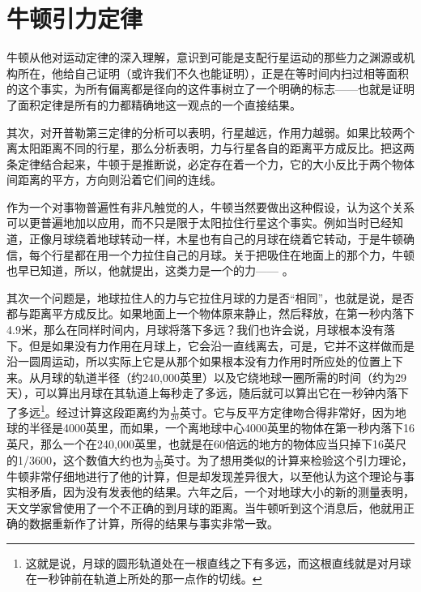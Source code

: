 \documentclass[12pt,oneside]{book}
\begin{document}
\section{牛顿引力定律}
牛顿从他对运动定律的深入理解，意识到可能是支配行星运动的那些力之渊源或机构所在，他给自己证明（或许我们不久也能证明），正是在等时间内扫过相等面积的这个事实，为所有偏离都是径向的这件事树立了一个明确的标志——也就是证明了面积定律是所有的力都精确地这一观点的一个直接结果。

其次，对开普勒第三定律的分析可以表明，行星越远，作用力越弱。如果比较两个离太阳距离不同的行星，那么分析表明，力与行星各自的距离平方成反比。把这两条定律结合起来，牛顿于是推断说，必定存在着一个力，它的大小反比于两个物体间距离的平方，方向则沿着它们间的连线。

作为一个对事物普遍性有非凡触觉的人，牛顿当然要做出这种假设，认为这个关系可以更普遍地加以应用，而不只是限于太阳拉住行星这个事实。例如当时已经知道，正像月球绕着地球转动一样，木星也有自己的月球在绕着它转动，于是牛顿确信，每个行星都在用一个力拉住自己的月球。关于把吸住在地面上的那个力，牛顿也早已知道，所以，他就提出，这类力是一个的力—— 。

其次一个问题是，地球拉住人的力与它拉住月球的力是否“相同”，也就是说，是否都与距离平方成反比。如果地面上一个物体原来静止，然后释放，在第一秒内落下4.9米，那么在同样时间内，月球将落下多远？我们也许会说，月球根本没有落下。但是如果没有力作用在月球上，它会沿一直线离去，可是，它并不这样做而是沿一圆周运动，所以实际上它是从那个如果根本没有力作用时所应处的位置上下来。从月球的轨道半径（约240,000英里）以及它绕地球一圈所需的时间（约为29天），可以算出月球在其轨道上每秒走了多远，随后就可以算出它在一秒钟内落下了多远\footnote{这就是说，月球的圆形轨道处在一根直线之下有多远，而这根直线就是对月球在一秒钟前在轨道上所处的那一点作的切线。}。经过计算这段距离约为$\frac{1}{20}$英寸。它与反平方定律吻合得非常好，因为地球的半径是4000英里，而如果，一个离地球中心4000英里的物体在第一秒内落下16英尺，那么一个在240,000英里，也就是在60倍远的地方的物体应当只掉下16英尺的1/3600，这个数值大约也为$\frac{1}{20}$英寸。为了想用类似的计算来检验这个引力理论，牛顿非常仔细地进行了他的计算，但是却发现差异很大，以至他认为这个理论与事实相矛盾，因为没有发表他的结果。六年之后，一个对地球大小的新的测量表明，天文学家曾使用了一个不正确的到月球的距离。当牛顿听到这个消息后，他就用正确的数据重新作了计算，所得的结果与事实非常一致。
\end{document}
